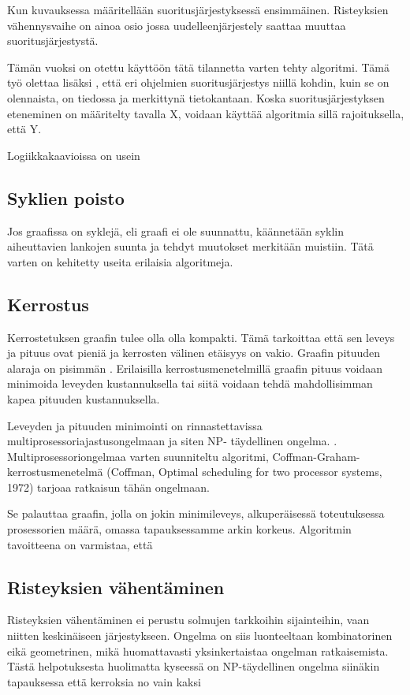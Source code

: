 \documentclass[finnish,12pt]{article}
\begin{document}
Kun kuvauksessa määritellään suoritusjärjestyksessä ensimmäinen. Risteyksien vähennysvaihe on ainoa osio jossa uudelleenjärjestely saattaa muuttaa suoritusjärjestystä. 

Tämän vuoksi on otettu käyttöön tätä tilannetta varten tehty algoritmi. Tämä työ olettaa lisäksi , että eri ohjelmien suoritusjärjestys niillä kohdin, kuin se on olennaista, on tiedossa ja merkittynä tietokantaan. Koska suoritusjärjestyksen eteneminen on määritelty tavalla X, voidaan käyttää algoritmia sillä rajoituksella, että Y. 

Logiikkakaavioissa on usein 

		\subsection{Syklien poisto}

Jos graafissa on syklejä, eli graafi ei ole suunnattu, käännetään syklin aiheuttavien lankojen suunta ja tehdyt muutokset merkitään muistiin.
Tätä varten on kehitetty useita erilaisia algoritmeja.

		\subsection{Kerrostus}

Kerrostetuksen graafin tulee olla olla kompakti. Tämä tarkoittaa että sen leveys ja pituus ovat pieniä ja kerrosten välinen etäisyys on vakio. Graafin pituuden alaraja on pisimmän . Erilaisilla kerrostusmenetelmillä graafin pituus voidaan minimoida leveyden kustannuksella tai siitä voidaan tehdä mahdollisimman kapea pituuden kustannuksella.

Leveyden ja pituuden minimointi on  rinnastettavissa multiprosessoriajastusongelmaan ja siten NP- täydellinen ongelma. \cite{RefWorks:39}. Multiprosessoriongelmaa varten suunniteltu algoritmi, Coffman-Graham-kerrostusmenetelmä (Coffman, Optimal scheduling for two processor systems, 1972) tarjoaa ratkaisun tähän ongelmaan.

Se palauttaa graafin, jolla on jokin minimileveys, alkuperäisessä toteutuksessa prosessorien määrä, omassa tapauksessamme arkin korkeus. 
Algoritmin tavoitteena on varmistaa, että 


		\subsection{Risteyksien vähentäminen}

Risteyksien vähentäminen ei perustu solmujen tarkkoihin sijainteihin, vaan niitten keskinäiseen järjestykseen. Ongelma on siis luonteeltaan kombinatorinen eikä geometrinen, mikä huomattavasti yksinkertaistaa ongelman ratkaisemista. Tästä helpotuksesta huolimatta kyseessä on NP-täydellinen ongelma siinäkin tapauksessa että kerroksia no vain kaksi \cite{RefWorks:40}
\end{document}
